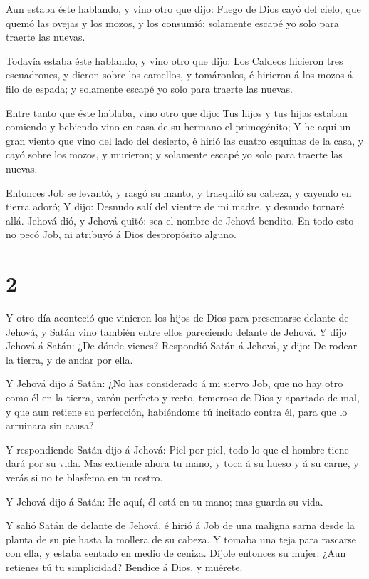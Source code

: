  Aun estaba éste hablando, y vino otro que dijo: Fuego de
Dios cayó del cielo, que quemó las ovejas y los mozos, y los consumió:
solamente escapé yo solo para traerte las nuevas.

 Todavía estaba éste hablando, y vino otro que dijo: Los
Caldeos hicieron tres escuadrones, y dieron sobre los camellos, y
tomáronlos, é hirieron á los mozos á filo de espada; y solamente escapé
yo solo para traerte las nuevas.

 Entre tanto que éste hablaba, vino otro que dijo: Tus
hijos y tus hijas estaban comiendo y bebiendo vino en casa de su hermano
el primogénito;  Y he aquí un gran viento que vino del lado
del desierto, é hirió las cuatro esquinas de la casa, y cayó sobre los
mozos, y murieron; y solamente escapé yo solo para traerte las nuevas.

 Entonces Job se levantó, y rasgó su manto, y trasquiló su
cabeza, y cayendo en tierra adoró;  Y dijo: Desnudo salí
del vientre de mi madre, y desnudo tornaré allá. Jehová dió, y Jehová
quitó: sea el nombre de Jehová bendito.  En todo esto no
pecó Job, ni atribuyó á Dios despropósito alguno.

\hypertarget{section-1}{%
\section{2}\label{section-1}}

 Y otro día aconteció que vinieron los hijos de Dios para
presentarse delante de Jehová, y Satán vino también entre ellos
pareciendo delante de Jehová.  Y dijo Jehová á Satán: ¿De
dónde vienes? Respondió Satán á Jehová, y dijo: De rodear la tierra, y
de andar por ella.

 Y Jehová dijo á Satán: ¿No has considerado á mi siervo Job,
que no hay otro como él en la tierra, varón perfecto y recto, temeroso
de Dios y apartado de mal, y que aun retiene su perfección, habiéndome
tú incitado contra él, para que lo arruinara sin causa?

 Y respondiendo Satán dijo á Jehová: Piel por piel, todo lo
que el hombre tiene dará por su vida.  Mas extiende ahora tu
mano, y toca á su hueso y á su carne, y verás si no te blasfema en tu
rostro.

 Y Jehová dijo á Satán: He aquí, él está en tu mano; mas
guarda su vida.

 Y salió Satán de delante de Jehová, é hirió á Job de una
maligna sarna desde la planta de su pie hasta la mollera de su cabeza.
 Y tomaba una teja para rascarse con ella, y estaba sentado
en medio de ceniza.  Díjole entonces su mujer: ¿Aun retienes
tú tu simplicidad? Bendice á Dios, y muérete.


